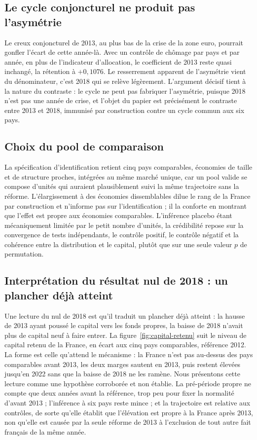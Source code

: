 \subsection{Le cycle conjoncturel ne produit pas l'asymétrie}

Le creux conjoncturel de 2013, au plus bas de la crise de la zone euro, pourrait gonfler l'écart de
cette année-là. Avec un contrôle de chômage par pays et par année, en plus de l'indicateur
d'allocation, le coefficient de 2013 reste quasi inchangé, la rétention à $+0{,}1076$. Le
resserrement apparent de l'asymétrie vient du dénominateur, c'est 2018 qui se relève légèrement.
L'argument décisif tient à la nature du contraste : le cycle ne peut pas fabriquer l'asymétrie,
puisque 2018 n'est pas une année de crise, et l'objet du papier est précisément le contraste entre
2013 et 2018, immunisé par construction contre un cycle commun aux six pays.

\subsection{Choix du pool de comparaison}

La spécification d'identification retient cinq pays comparables, économies de taille et de
structure proches, intégrées au même marché unique, car un pool valide se compose d'unités qui
auraient plausiblement suivi la même trajectoire sans la réforme. L'élargissement à des économies
dissemblables dilue le rang de la France par construction et n'informe pas sur l'identification ; il
la conforte en montrant que l'effet est propre aux économies comparables. L'inférence placebo étant
mécaniquement limitée par le petit nombre d'unités, la crédibilité repose sur la convergence de
tests indépendants, le contrôle positif, le contrôle négatif et la cohérence entre la distribution
et le capital, plutôt que sur une seule valeur $p$ de permutation.

\subsection{Interprétation du résultat nul de 2018 : un plancher déjà atteint}

Une lecture du nul de 2018 est qu'il traduit un plancher déjà atteint : la hausse de 2013 ayant
poussé le capital vers les fonds propres, la baisse de 2018 n'avait plus de capital neuf à faire
entrer. La figure~\ref{fig:capital-retenu} suit le niveau de capital retenu de la France, en écart
aux cinq pays comparables, référence 2012. La forme est celle qu'attend le mécanisme : la France n'est pas
au-dessus des pays comparables avant 2013, les deux marges sautent en 2013, puis restent élevées jusqu'en
2022 sans que la baisse de 2018 ne les ramène. Nous présentons cette lecture comme une hypothèse
corroborée et non établie. La pré-période propre ne compte que deux années avant la référence, trop
peu pour fixer la normalité d'avant 2013 ; l'inférence à six pays reste mince ; et la trajectoire est
relative aux contrôles, de sorte qu'elle établit que l'élévation est propre à la France après 2013,
non qu'elle est causée par la seule réforme de 2013 à l'exclusion de tout autre fait français de la
même année.


